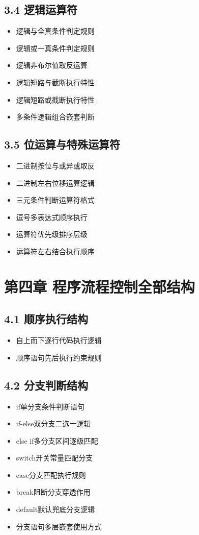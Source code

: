 \subsection{3.4 逻辑运算符}
\begin{itemize}
\item 逻辑与全真条件判定规则
\item 逻辑或一真条件判定规则
\item 逻辑非布尔值取反运算
\item 逻辑短路与截断执行特性
\item 逻辑短路或截断执行特性
\item 多条件逻辑组合嵌套判断
\end{itemize}

\subsection{3.5 位运算与特殊运算符}
\begin{itemize}
\item 二进制按位与或异或取反
\item 二进制左右位移运算逻辑
\item 三元条件判断运算符格式
\item 逗号多表达式顺序执行
\item 运算符优先级排序层级
\item 运算符左右结合执行顺序
\end{itemize}

\section{第四章 程序流程控制全部结构}
\subsection{4.1 顺序执行结构}
\begin{itemize}
\item 自上而下逐行代码执行逻辑
\item 顺序语句先后执行约束规则
\end{itemize}

\subsection{4.2 分支判断结构}
\begin{itemize}
\item if单分支条件判断语句
\item if-else双分支二选一逻辑
\item else if多分支区间逐级匹配
\item switch开关常量匹配分支
\item case分支匹配执行规则
\item break阻断分支穿透作用
\item default默认兜底分支逻辑
\item 分支语句多层嵌套使用方式
\end{itemize}


